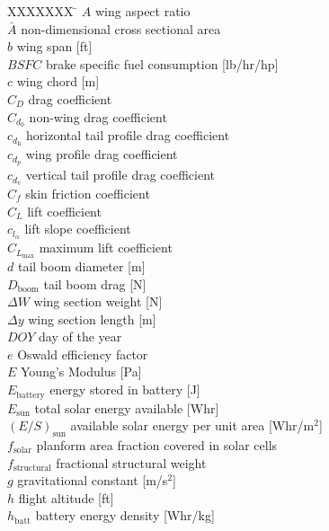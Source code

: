 \documentclass[]{aiaa-tc}%
\begin{document}
\begin{multicols}{2}
\small

\begin{tabbing}
  XXXXXXX \= \kill%
$A$ \> wing aspect ratio \\
$\bar{A}$ \> non-dimensional cross sectional area \\
$b$ \> wing span [ft] \\
$BSFC$ \> brake specific fuel consumption [lb/hr/hp] \\
$c$ \> wing chord [m] \\
$C_D$ \> drag coefficient \\
$C_{d_0}$ \> non-wing drag coefficient \\
$c_{d_{\text{h}}}$ \> horizontal tail profile drag coefficient \\
$c_{d_p}$ \> wing profile drag coefficient \\
$c_{d_{\text{v}}}$ \> vertical tail profile drag coefficient \\
$C_f$ \> skin friction coefficient \\
$C_L$ \> lift coefficient \\
$c_{l_{\alpha}}$ \> lift slope coefficient \\
$C_{L_{\text{max}}}$ \> maximum lift coefficient \\
$d$ \> tail boom diameter [m] \\
$D_{\text{boom}}$ \> tail boom drag [N] \\
$\Delta W$ \> wing section weight [N] \\
$\Delta y$ \> wing section length [m] \\
$DOY$ \> day of the year \\
$e$ \> Oswald efficiency factor \\
$E$ \> Young's Modulus [Pa] \\
$E_{\text{battery}}$ \> energy stored in battery [J] \\
$E_{\text{sun}}$ \> total solar energy available [Whr] \\
$(E/S)_{\text{sun}}$ \> available solar energy per unit area [Whr/m$^2$] \\
$f_{\text{solar}}$ \> planform area fraction covered in solar cells \\
$f_{\text{structural}}$ \> fractional structural weight\\
$g$ \> gravitational constant [m/s$^2$] \\
$h$ \> flight altitude [ft] \\
$h_{\text{batt}}$ \> battery energy density [Whr/kg] \\

\end{tabbing}
\end{multicols}
\end{document}
